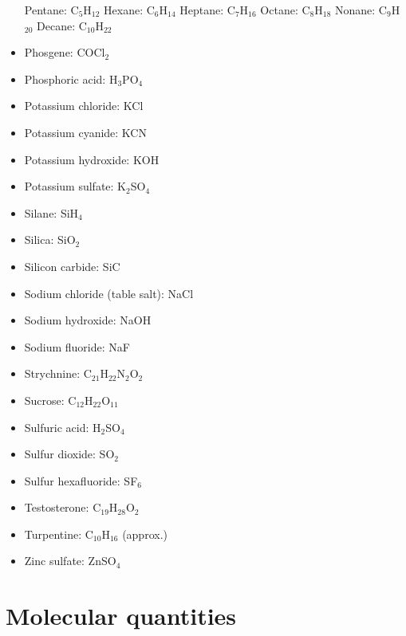 \begin{itemize}
\subitem Pentane: C$_{5}$H$_{12}$
\subitem Hexane: C$_{6}$H$_{14}$
\subitem Heptane: C$_{7}$H$_{16}$
\subitem Octane: C$_{8}$H$_{18}$
\subitem Nonane: C$_{9}$H$_{20}$
\subitem Decane: C$_{10}$H$_{22}$
\item Phosgene: COCl$_{2}$
\item Phosphoric acid: H$_{3}$PO$_{4}$
\item Potassium chloride: KCl
\item Potassium cyanide: KCN
\item Potassium hydroxide: KOH
\item Potassium sulfate: K$_{2}$SO$_{4}$
\item Silane: SiH$_{4}$
\item Silica: SiO$_{2}$
\item Silicon carbide: SiC
\item Sodium chloride (table salt): NaCl
\item Sodium hydroxide: NaOH
\item Sodium fluoride: NaF
\item Strychnine: C$_{21}$H$_{22}$N$_{2}$O$_{2}$
\item Sucrose: C$_{12}$H$_{22}$O$_{11}$
\item Sulfuric acid: H$_{2}$SO$_{4}$
\item Sulfur dioxide: SO$_{2}$
\item Sulfur hexafluoride: SF$_{6}$
\item Testosterone: C$_{19}$H$_{28}$O$_{2}$
\item Turpentine: C$_{10}$H$_{16}$ (approx.)
\item Zinc sulfate: ZnSO$_{4}$
\end{itemize}








\filbreak
\section{Molecular quantities}

\label{Molecular quantities}

